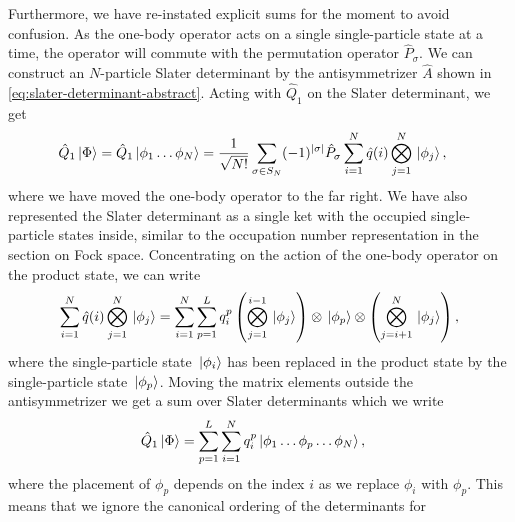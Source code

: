         Furthermore, we have re-instated explicit sums for the moment to avoid
        confusion.
        As the one-body operator acts on a single single-particle state at a
        time, the operator will commute with the permutation operator
        $\hat{P}_{\sigma}$.
        We can construct an $N$-particle Slater determinant by the
        antisymmetrizer $\hat{A}$ shown in
        \autoref{eq:slater-determinant-abstract}.
        Acting with $\hat{Q}_1$ on the Slater determinant, we get
        \begin{align}
            \hat{Q}_1\ket*{\Phi}
            &=
            \hat{Q}_1\ket*{\phi_1\dots\phi_N}
            =
            \frac{1}{\sqrt{N!}}
            \sum_{\sigma \in S_N}
            (-1)^{\abs{\sigma}}
            \hat{P}_{\sigma}
            \sum_{i = 1}^{N}\hat{q}(i)
            \bigotimes_{j = 1}^{N}
            \ket*{\phi_j},
        \end{align}
        where we have moved the one-body operator to the far right.
        We have also represented the Slater determinant as a single ket with the
        occupied single-particle states inside, similar to the occupation number
        representation in the section on Fock space.
        Concentrating on the action of the one-body operator on the product
        state, we can write
        \begin{align}
            \sum_{i = 1}^{N}\hat{q}(i)
            \bigotimes_{j = 1}^{N}
            \ket*{\phi_j}
            =
            \sum_{i = 1}^{N}
            \sum_{p = 1}^{L}
            q^{p}_{i}
            \left( 
                \bigotimes_{j = 1}^{i - 1}
                \ket*{\phi_j}
             \right)
            \otimes \ket*{\phi_p}
            \otimes \left( 
                \bigotimes_{j = i + 1}^{N}
                \ket*{\phi_j}
             \right),
        \end{align}
        where the single-particle state $\ket*{\phi_i}$ has been replaced in the
        product state by the single-particle state $\ket*{\phi_p}$.
        Moving the matrix elements outside the antisymmetrizer we get a sum over
        Slater determinants which we write
        \begin{align}
            \hat{Q}_1\ket*{\Phi}
            &=
            \sum_{p = 1}^{L}
            \sum_{i = 1}^{N}q^{p}_{i}
            \ket*{\phi_1\dots\phi_p\dots\phi_N},
        \end{align}
        where the placement of $\phi_p$ depends on the index $i$ as we replace
        $\phi_i$ with $\phi_p$.
        This means that we ignore the canonical ordering of the determinants for
